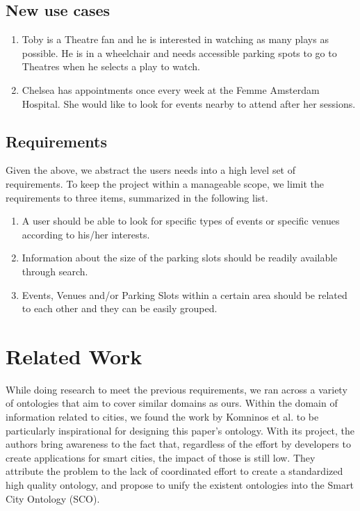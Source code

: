 \documentclass[runningheads,a4paper]{../../StyleFiles/llncs}
\begin{document}
\subsection{New use cases}
\begin{enumerate}
	\item Toby is a Theatre fan and he is interested in watching as many plays as possible. He is in a wheelchair and needs accessible parking spots to go to Theatres when he selects a play to watch. 
	\item Chelsea has appointments once every week at the Femme Amsterdam Hospital. She would like to look for events nearby to attend after her sessions. 
\end{enumerate}

\subsection{Requirements}
\label{requirements}
Given the above, we abstract the users needs into a high level set of requirements. To keep the project within a manageable scope, we limit the requirements to three items, summarized in the following list.

\begin{enumerate}
	\item A user should be able to look for specific types of events or specific venues according to his/her interests.
	\item Information about the size of the parking slots should be readily available through search. 
	\item Events, Venues and/or Parking Slots within a certain area should be related to each other and they can be easily grouped. 
\end{enumerate}


\section{Related Work}
While doing research to meet the previous requirements, we ran across a variety of ontologies that aim to cover similar domains as ours. Within the domain of information related to cities, we found the work by Komninos et al.\cite{komninos2015smart} to be particularly inspirational for designing this paper's ontology. With its project, the authors bring awareness to the fact that, regardless of the effort by developers to create applications for smart cities, the impact of those is still low. They attribute the problem to the lack of coordinated effort to create a standardized high quality ontology, and propose to unify the existent ontologies into the Smart City Ontology (SCO).   %
\end{document}
